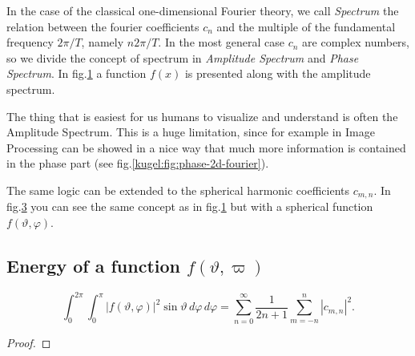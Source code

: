 \begin{figure}
  \centering
  \caption{}
  \label{kugel:fig:1d-fourier}
\end{figure}

In the case of the classical one-dimensional Fourier theory, we call \emph{Spectrum} the relation between the fourier coefficients $c_n$ and the multiple 
of the fundamental frequency $2\pi/T$, namely $n 2\pi/T$. In the most general case $c_n$ are complex numbers, so we divide the concept of spectrum in 
\emph{Amplitude Spectrum} and \emph{Phase Spectrum}. In fig.\ref{kugel:fig:1d-fourier} a function $f(x)$ is presented along with the amplitude spectrum.

\begin{figure}
  \centering
  \caption{}
  \label{kugel:fig:phase&amplitude-2d-fourier}
\end{figure}

The thing that is easiest for us humans to visualize and understand is often the Amplitude Spectrum.
This is a huge limitation, since for example in Image Processing can be showed in a nice way that much more information is contained in the phase part (see fig.\ref{kugel:fig:phase-2d-fourier}).

\begin{figure}
  \centering
  \caption{}
  \label{kugel:fig:fourier-on-sphere-increasing-index}
\end{figure}

The same logic can be extended to the spherical harmonic coefficients $c_{m,n}$. In fig.\ref{kugel:fig:fourier-on-sphere-increasing-index} you can see the same concept as in fig.\ref{kugel:fig:1d-fourier} 
but with a spherical function $f(\vartheta, \varphi)$.

\subsection{Energy of a function $f(\vartheta, \varpi)$}

\begin{lemma}
  \begin{equation*}
    \int_0^{2\pi}\int_0^\pi |f(\vartheta, \varphi)|^2  \sin\vartheta \, d\varphi \, d\varphi = \sum_{n=0}^\infty \frac{1}{2n+1} \sum_{m=-n}^n |c_{m,n}|^2.
  \end{equation*}
\end{lemma}
\begin{proof}
\end{proof}


